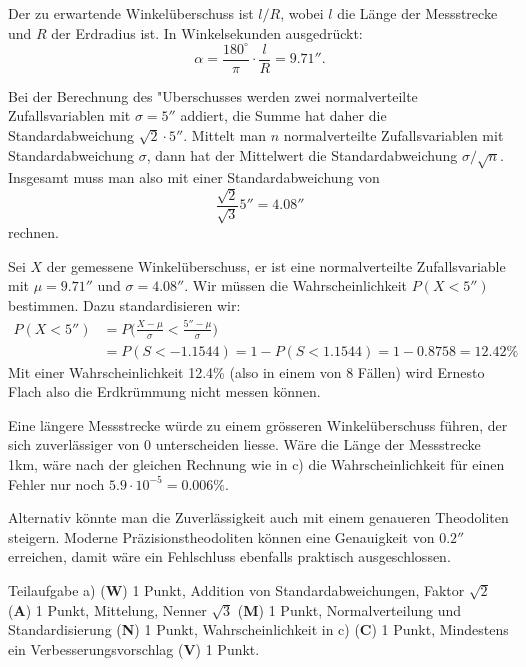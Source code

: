 \begin{loesung}
\begin{teilaufgaben}
\item
Der zu erwartende Winkelüberschuss ist $l/R$, wobei $l$ die Länge der
Messstrecke und $R$ der Erdradius ist.
In Winkelsekunden ausgedrückt: 
\[
\alpha = \frac{180^\circ}{\pi}\cdot\frac{l}{R}=9.71''.
\]
\item
Bei der Berechnung des "Uberschusses werden zwei normalverteilte
Zufallsvariablen mit $\sigma=5''$ addiert, die Summe hat daher
die Standardabweichung $\sqrt{2}\cdot 5''$.
Mittelt man $n$ normalverteilte Zufallsvariablen mit Standardabweichung
$\sigma$, dann hat der Mittelwert die Standardabweichung $\sigma/\sqrt{n}$.
Insgesamt muss man also mit einer Standardabweichung von 
\[
\frac{\sqrt{2}}{\sqrt{3}}5''= 4.08''
\]
rechnen.
\item
Sei $X$ der gemessene Winkelüberschuss, er ist eine normalverteilte
Zufallsvariable mit $\mu=9.71''$ und $\sigma=4.08''$.
Wir müssen die Wahrscheinlichkeit $P(X < 5'')$ bestimmen.
Dazu standardisieren wir:
\begin{align*}
P(X<5'')
&=
P\biggl(
\frac{X-\mu}{\sigma}<\frac{5''-\mu}{\sigma}\biggr)
\\
&=P(S<-1.1544)
=1-P(S<1.1544)
=1-0.8758 = 12.42\%
\end{align*}
Mit einer Wahrscheinlichkeit 12.4\% (also in einem von 8 Fällen)
wird Ernesto Flach also die Erdkrümmung nicht messen können.
\item
Eine längere Messstrecke würde zu einem grösseren Winkelüberschuss
führen, der sich zuverlässiger von $0$ unterscheiden liesse.
Wäre die Länge der Messstrecke 1km, wäre nach der gleichen Rechnung
wie in c) die Wahrscheinlichkeit für einen Fehler nur noch
$5.9\cdot10^{-5}=0.006\%$.

Alternativ könnte man die Zuverlässigkeit auch mit einem genaueren
Theodoliten steigern.
Moderne Präzisionstheodoliten können eine Genauigkeit von $0.2''$
erreichen, damit wäre ein Fehlschluss ebenfalls praktisch ausgeschlossen.
\qedhere
\end{teilaufgaben}
\end{loesung}

\begin{bewertung}
Teilaufgabe a) ({\bf W}) 1 Punkt,
Addition von Standardabweichungen, Faktor $\sqrt{2}$ ({\bf A}) 1 Punkt,
Mittelung, Nenner $\sqrt{3}$ ({\bf M}) 1 Punkt,
Normalverteilung und Standardisierung ({\bf N}) 1 Punkt,
Wahrscheinlichkeit in c) ({\bf C}) 1 Punkt,
Mindestens ein Verbesserungsvorschlag ({\bf V}) 1 Punkt.
\end{bewertung}




